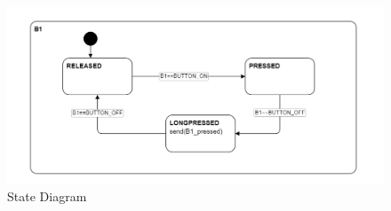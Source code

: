 \documentclass[12pt]{article}
\begin{document}
\begin{figure}[h] %
    \centering %
    \includegraphics[width=1\textwidth]{state_diagram2.png} %
    \caption{State Diagram} %
    \label{fig:Button State} %
\end{figure}
\newpage
{}
\listoffigures
\end{document}
